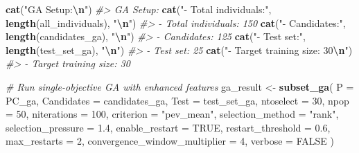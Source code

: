 \documentclass[
]{article}
\newenvironment{Shaded}{\begin{snugshade}}{\end{snugshade}}
\newcommand{\AttributeTok}[1]{\textcolor[rgb]{0.13,0.29,0.53}{#1}}
\newcommand{\CommentTok}[1]{\textcolor[rgb]{0.56,0.35,0.01}{\textit{#1}}}
\newcommand{\ConstantTok}[1]{\textcolor[rgb]{0.56,0.35,0.01}{#1}}
\newcommand{\DecValTok}[1]{\textcolor[rgb]{0.00,0.00,0.81}{#1}}
\newcommand{\FloatTok}[1]{\textcolor[rgb]{0.00,0.00,0.81}{#1}}
\newcommand{\FunctionTok}[1]{\textcolor[rgb]{0.13,0.29,0.53}{\textbf{#1}}}
\newcommand{\NormalTok}[1]{#1}
\newcommand{\OtherTok}[1]{\textcolor[rgb]{0.56,0.35,0.01}{#1}}
\newcommand{\SpecialCharTok}[1]{\textcolor[rgb]{0.81,0.36,0.00}{\textbf{#1}}}
\newcommand{\StringTok}[1]{\textcolor[rgb]{0.31,0.60,0.02}{#1}}
\begin{document}
\begin{Shaded}
\begin{Highlighting}[]
\FunctionTok{cat}\NormalTok{(}\StringTok{"GA Setup:}\SpecialCharTok{\textbackslash{}n}\StringTok{"}\NormalTok{)}
\CommentTok{\#\textgreater{} GA Setup:}
\FunctionTok{cat}\NormalTok{(}\StringTok{"{-} Total individuals:"}\NormalTok{, }\FunctionTok{length}\NormalTok{(all\_individuals), }\StringTok{"}\SpecialCharTok{\textbackslash{}n}\StringTok{"}\NormalTok{)}
\CommentTok{\#\textgreater{} {-} Total individuals: 150}
\FunctionTok{cat}\NormalTok{(}\StringTok{"{-} Candidates:"}\NormalTok{, }\FunctionTok{length}\NormalTok{(candidates\_ga), }\StringTok{"}\SpecialCharTok{\textbackslash{}n}\StringTok{"}\NormalTok{) }
\CommentTok{\#\textgreater{} {-} Candidates: 125}
\FunctionTok{cat}\NormalTok{(}\StringTok{"{-} Test set:"}\NormalTok{, }\FunctionTok{length}\NormalTok{(test\_set\_ga), }\StringTok{"}\SpecialCharTok{\textbackslash{}n}\StringTok{"}\NormalTok{)}
\CommentTok{\#\textgreater{} {-} Test set: 25}
\FunctionTok{cat}\NormalTok{(}\StringTok{"{-} Target training size: 30}\SpecialCharTok{\textbackslash{}n}\StringTok{"}\NormalTok{)}
\CommentTok{\#\textgreater{} {-} Target training size: 30}

\CommentTok{\# Run single{-}objective GA with enhanced features}
\NormalTok{ga\_result }\OtherTok{\textless{}{-}} \FunctionTok{subset\_ga}\NormalTok{(}
  \AttributeTok{P =}\NormalTok{ PC\_ga,}
  \AttributeTok{Candidates =}\NormalTok{ candidates\_ga,}
  \AttributeTok{Test =}\NormalTok{ test\_set\_ga,}
  \AttributeTok{ntoselect =} \DecValTok{30}\NormalTok{,}
  \AttributeTok{npop =} \DecValTok{50}\NormalTok{,}
  \AttributeTok{niterations =} \DecValTok{100}\NormalTok{,}
  \AttributeTok{criterion =} \StringTok{"pev\_mean"}\NormalTok{,}
  \AttributeTok{selection\_method =} \StringTok{"rank"}\NormalTok{,}
  \AttributeTok{selection\_pressure =} \FloatTok{1.4}\NormalTok{,}
  \AttributeTok{enable\_restart =} \ConstantTok{TRUE}\NormalTok{,}
  \AttributeTok{restart\_threshold =} \FloatTok{0.6}\NormalTok{,}
  \AttributeTok{max\_restarts =} \DecValTok{2}\NormalTok{,}
  \AttributeTok{convergence\_window\_multiplier =} \DecValTok{4}\NormalTok{,}
  \AttributeTok{verbose =} \ConstantTok{FALSE}
\NormalTok{)}


\end{Highlighting}
\end{Shaded}
\end{document}
